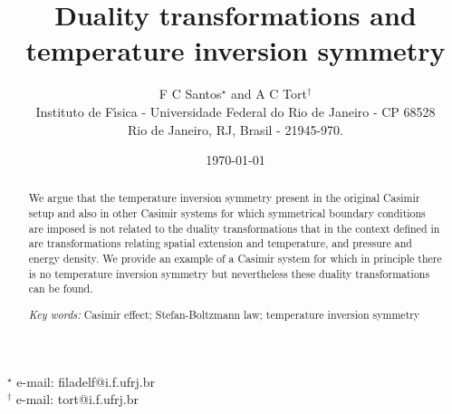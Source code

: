 \documentclass[a4paper,12pt]{article}
\begin{document}
\title{Duality transformations and temperature inversion symmetry }
\author{{\large F C Santos$^{\star}$ and A C Tort$%
^{\dagger}$} \\
Instituto de F\'{\i}sica - Universidade Federal do Rio de Janeiro - CP 68528
\\
Rio de Janeiro, RJ, Brasil - 21945-970.}
\date{\today}
\maketitle
%
\begin{abstract}
%
We argue that the temperature inversion symmetry present in the original Casimir setup and also in other Casimir systems for which symmetrical boundary conditions are imposed is not related to the duality transformations that in the context defined in \cite{Fukushima&Ohta2001}  are transformations relating spatial extension and temperature, and pressure and energy density. We provide an example of a Casimir system for which in principle there is no temperature inversion symmetry but nevertheless these duality transformations can be found.
%

\vskip 1.0cm
%
\emph{Key words:} Casimir effect; Stefan-Boltzmann law; temperature inversion symmetry 
%
\end{abstract}
%
\vfill
\noindent $^{\star }$ {e-mail: filadelf@i.f.ufrj.br}\\
\noindent $^\dagger$ {e-mail: tort@i.f.ufrj.br}
\clearpage
%
\end{document}
